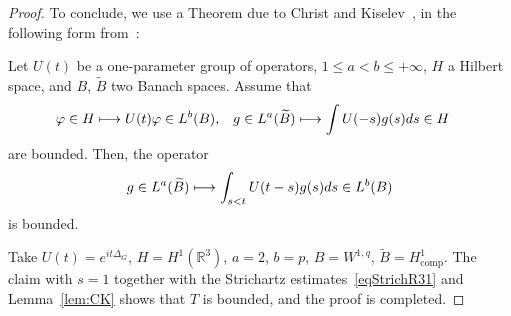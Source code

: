 \documentclass[AHL,Unicode,longabstracts,published]{cedram}
\newcommand*\R{\mathbb{R}}
\DeclareMathOperator{\comp}{comp}
\let\oldmapsto\mapsto
\renewcommand*{\mapsto}{\mathchoice{\longmapsto}{\oldmapsto}{\oldmapsto}{\oldmapsto}}
\begin{document}
\begin{proof}
To conclude, we use a Theorem due to Christ and Kiselev~\cite{ChKi01}, in the following form from~\cite[Lemma~5.6]{PV1}:
\begin{lemm} \label{lem:CK}
Let $U(t)$ be a one-parameter group of operators, $1\leq a < b \leq +\infty$, $H$ a Hilbert space, and $B$, $\widetilde B$ two Banach spaces. Assume that
\begin{align*}
&\varphi \in H \mapsto U(t) \varphi \in L^b(B), &&g \in L^a(\widetilde B) \mapsto \int U(-s)g(s) ds \in H
\end{align*}
are bounded. Then, the operator
\[
g \in L^a(\widetilde B) \mapsto \int_{s<t} U(t-s)g(s) ds \in L^b(B)
\]
is bounded.
\end{lemm} Take $U(t) = e^{it\Delta_G}$, $H = H^1(\R^3)$, $a=2$, $b = p$, $B=W^{1,q}$, $\widetilde B = H^{1}_{\comp}$. The claim with $s=1$ together with the Strichartz estimates~\eqref{eqStrichR31} and Lemma~\ref{lem:CK} shows that $T$ is bounded, and the proof is completed.
\end{proof}
\end{document}

